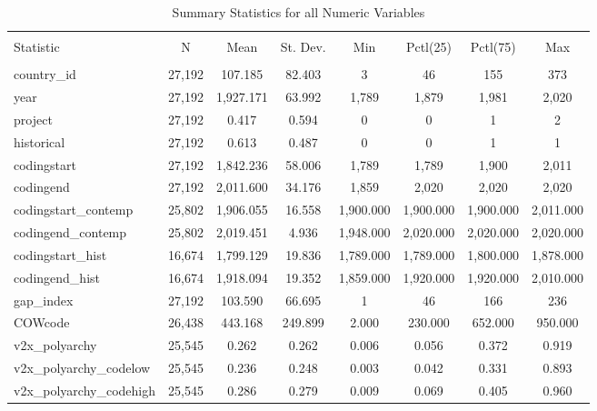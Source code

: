 
\begin{table}[!htbp] \centering 
  \caption{Summary Statistics for all Numeric Variables} 
  \label{} 
\begin{tabular}{@{\extracolsep{5pt}}lccccccc} 
\\[-1.8ex]\hline 
\hline \\[-1.8ex] 
Statistic & \multicolumn{1}{c}{N} & \multicolumn{1}{c}{Mean} & \multicolumn{1}{c}{St. Dev.} & \multicolumn{1}{c}{Min} & \multicolumn{1}{c}{Pctl(25)} & \multicolumn{1}{c}{Pctl(75)} & \multicolumn{1}{c}{Max} \\ 
\hline \\[-1.8ex] 
country\_id & 27,192 & 107.185 & 82.403 & 3 & 46 & 155 & 373 \\ 
year & 27,192 & 1,927.171 & 63.992 & 1,789 & 1,879 & 1,981 & 2,020 \\ 
project & 27,192 & 0.417 & 0.594 & 0 & 0 & 1 & 2 \\ 
historical & 27,192 & 0.613 & 0.487 & 0 & 0 & 1 & 1 \\ 
codingstart & 27,192 & 1,842.236 & 58.006 & 1,789 & 1,789 & 1,900 & 2,011 \\ 
codingend & 27,192 & 2,011.600 & 34.176 & 1,859 & 2,020 & 2,020 & 2,020 \\ 
codingstart\_contemp & 25,802 & 1,906.055 & 16.558 & 1,900.000 & 1,900.000 & 1,900.000 & 2,011.000 \\ 
codingend\_contemp & 25,802 & 2,019.451 & 4.936 & 1,948.000 & 2,020.000 & 2,020.000 & 2,020.000 \\ 
codingstart\_hist & 16,674 & 1,799.129 & 19.836 & 1,789.000 & 1,789.000 & 1,800.000 & 1,878.000 \\ 
codingend\_hist & 16,674 & 1,918.094 & 19.352 & 1,859.000 & 1,920.000 & 1,920.000 & 2,010.000 \\ 
gap\_index & 27,192 & 103.590 & 66.695 & 1 & 46 & 166 & 236 \\ 
COWcode & 26,438 & 443.168 & 249.899 & 2.000 & 230.000 & 652.000 & 950.000 \\ 
v2x\_polyarchy & 25,545 & 0.262 & 0.262 & 0.006 & 0.056 & 0.372 & 0.919 \\ 
v2x\_polyarchy\_codelow & 25,545 & 0.236 & 0.248 & 0.003 & 0.042 & 0.331 & 0.893 \\ 
v2x\_polyarchy\_codehigh & 25,545 & 0.286 & 0.279 & 0.009 & 0.069 & 0.405 & 0.960 \\ 

\end{tabular}
\end{table}
